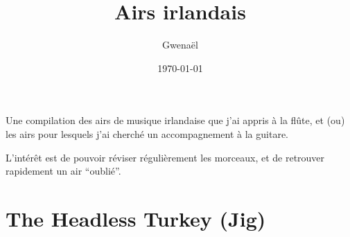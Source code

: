 \documentclass[a4paper,12pt]{article}
\author{Gwenaël \bsc{Lambrouin}}
\title{Airs irlandais}
\date{\today}
\begin{document}
\maketitle


Une compilation des airs de musique irlandaise que j'ai appris à la
flûte, et (ou) les airs pour lesquels j'ai cherché un accompagnement à la
guitare.

L'intérêt est de pouvoir réviser régulièrement les morceaux, et de retrouver
rapidement un air ``oublié''.




\pagebreak
\section{The Headless Turkey (Jig)}
\label{003-TheHeadlessTurkey}

\end{document}
